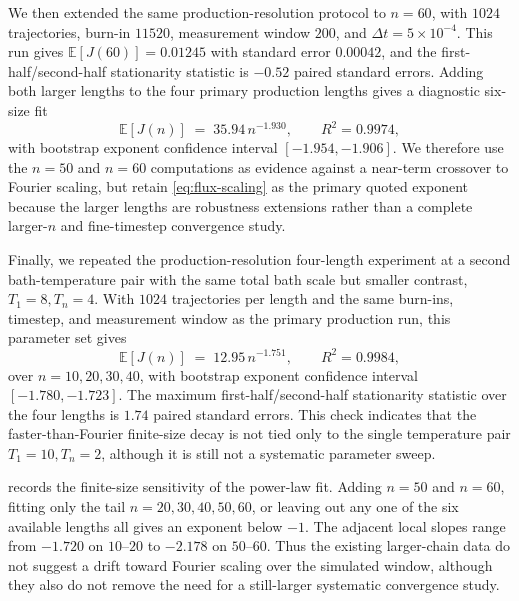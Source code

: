 \documentclass[11pt,a4paper]{article}
\theoremstyle{definition}
\newcommand{\E}{\mathbb{E}}
\numberwithin{equation}{section}   %
\begin{document}
We then extended the same production-resolution protocol to $n=60$, with
$1024$ trajectories, burn-in $11520$, measurement window $200$, and
$\Delta t=5\times10^{-4}$. This run gives
$\E[J(60)]=0.01245$ with standard error $0.00042$, and the
first-half/second-half stationarity statistic is $-0.52$ paired standard
errors. Adding both larger lengths to the four primary production lengths gives
a diagnostic six-size fit
\[
  \E[J(n)] \;=\; 35.94\,n^{-1.930},
  \qquad R^2=0.9974,
\]
with bootstrap exponent confidence interval $[-1.954,-1.906]$. We therefore
use the $n=50$ and $n=60$ computations as evidence against a near-term
crossover to Fourier scaling, but retain \eqref{eq:flux-scaling} as the
primary quoted exponent because the larger lengths are robustness extensions
rather than a complete larger-$n$ and fine-timestep convergence study.

Finally, we repeated the production-resolution four-length experiment at a
second bath-temperature pair with the same total bath scale but smaller
contrast, $T_1=8,T_n=4$.  With $1024$ trajectories per length and the same
burn-ins, timestep, and measurement window as the primary production run, this
parameter set gives
\[
  \E[J(n)] \;=\; 12.95\,n^{-1.751},
  \qquad R^2=0.9984,
\]
over $n=10,20,30,40$, with bootstrap exponent confidence interval
$[-1.780,-1.723]$.  The maximum first-half/second-half stationarity statistic
over the four lengths is $1.74$ paired standard errors.  This check indicates
that the faster-than-Fourier finite-size decay is not tied only to the single
temperature pair $T_1=10,T_n=2$, although it is still not a systematic
parameter sweep.

 records the finite-size sensitivity of the
power-law fit. Adding $n=50$ and $n=60$, fitting only the tail
$n=20,30,40,50,60$, or leaving out any one of the six available lengths all
gives an exponent below $-1$. The adjacent local slopes range from $-1.720$ on
$10$--$20$ to $-2.178$ on $50$--$60$.  Thus the existing larger-chain data do
not suggest a drift toward Fourier scaling over the simulated window, although
they also do not remove the need for a still-larger systematic convergence
study.
\end{document}
